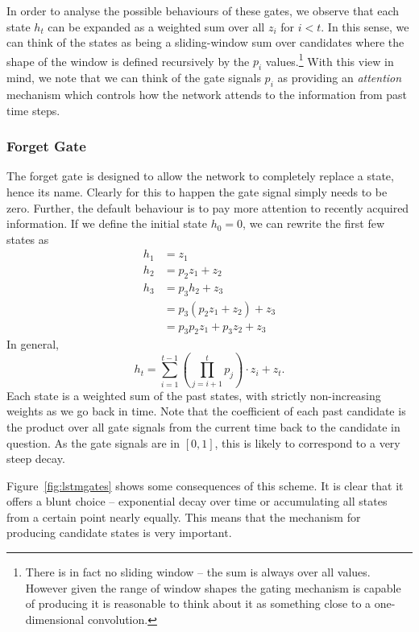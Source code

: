 In order to analyse the possible behaviours of these gates, we observe that each state \(h_t\)
can be expanded as a weighted sum over all \(z_i\) for \(i < t\). In this sense, we can think of
the states as being a sliding-window sum over candidates where the shape of the window is defined
recursively by the \(p_i\) values.\footnote{There is in fact no sliding window -- the sum is always
over all values. However given the range of window shapes the gating mechanism is capable of producing
it is reasonable to think about it as something close to a one-dimensional convolution.}
With this view in mind, we note that we can think of the
gate signals \(p_i\) as providing an \emph{attention} mechanism which controls how the network
attends to the information from past time steps.

\subsubsection{Forget Gate}
The forget gate is designed to allow the network to completely replace a state, hence its name.
Clearly for this to happen the gate signal simply needs to be zero. Further, the default behaviour
is to pay more attention to recently acquired information. If we define the initial
state \(h_0 = 0\), we can rewrite the first few states as
\begin{align}
	h_1 &= z_1 \\
	h_2 &= p_2z_1 + z_2 \\
	h_3 &= p_3h_2 + z_3 \\
		&= p_3(p_2z_1 + z_2) + z_3 \\
		&= p_3p_2z_1 + p_3z_2 + z_3
\end{align} In general,
\begin{equation}
	h_t = \sum_{i=1}^{t-1} \left(\prod_{j=i+1}^t p_j\right) \cdot z_i + z_t.
\end{equation} Each state is a weighted sum of the past states, with strictly
non-increasing weights as we go back in time.
Note that the coefficient of each past candidate is the product over all gate signals from the
current time back to the candidate in question. As the gate signals are in \([0, 1]\), 
this is likely to correspond to a very steep decay.


Figure~\ref{fig:lstmgates} shows some consequences of this scheme. It is clear
that it offers a blunt choice -- exponential decay over time or accumulating all states from a
 certain point nearly equally. This means that the mechanism for
producing candidate states is very important. 


